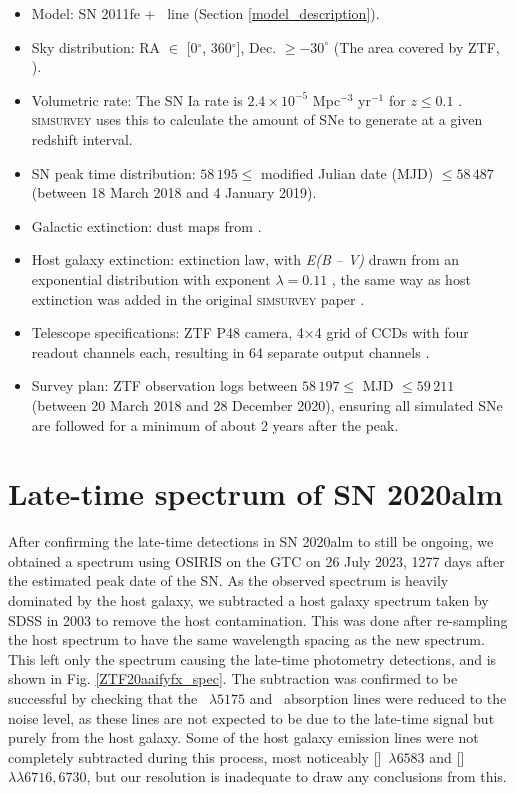 \documentclass[a4paper,oneside,12pt, class=Latex/Classes/PhDthesisPSnPDF, crop=false]{standalone}
\begin{document}
\begin{itemize}
 \item Model: SN 2011fe + \Halpha~line (Section \ref{model_description}).
 \item Sky distribution: RA $\in$ [0$^{\circ}$, 360$^{\circ}$], Dec. $\geq -30^{\circ}$ (The area covered by ZTF, \citealt{ZTF_Surveys_Scheduler}).
 \item Volumetric rate: The SN Ia rate is $2.4\times10^{-5}$ Mpc$^{-3}$ yr$^{-1}$ for $z \leq 0.1$ \citep{SNIa_rate}. \textsc{simsurvey} uses this to calculate the amount of SNe to generate at a given redshift interval.
 \item SN peak time distribution: $58\,195 \leq$ modified Julian date (MJD) $\leq 58\,487$ (between 18 March 2018 and 4 January 2019).
 \item Galactic extinction: dust maps from \citet{SFD98_dust_maps}.
 \item Host galaxy extinction: \citet{ccm89_extinction_law} extinction law, with \textit{E(B -- V)} drawn from an exponential distribution with exponent $\lambda=0.11$ \citep{EBV_simsurvey}, the same way as host extinction was added in the original \textsc{simsurvey} paper \citep{simsurvey_main}.
 \item Telescope specifications: ZTF P48 camera, 4$\times$4 grid of CCDs with four readout channels each, resulting in 64 separate output channels \citep{ZTF_Observing_System}.
 \item Survey plan: ZTF observation logs between $58\,197\leq$ MJD $\leq 59\,211$ (between 20 March 2018 and 28 December 2020), ensuring all simulated SNe are followed for a minimum of about 2 years after the peak.
\end{itemize}


\section{Late-time spectrum of SN 2020alm}
\label{spec_sec}
After confirming the late-time detections in SN 2020alm to still be ongoing, we obtained a spectrum using OSIRIS on the GTC on 26 July 2023, 1277 days after the estimated peak date of the SN. As the observed spectrum is heavily dominated by the host galaxy, we subtracted a host galaxy spectrum taken by SDSS in 2003 to remove the host contamination. This was done after re-sampling the host spectrum to have the same wavelength spacing as the new spectrum. This left only the spectrum causing the late-time photometry detections, and is shown in Fig. \ref{ZTF20aaifyfx_spec}. The subtraction was confirmed to be successful by checking that the \MgI~${\lambda5175}$ and \NaID~absorption lines were reduced to the noise level, as these lines are not expected to be due to the late-time signal but purely from the host galaxy. Some of the host galaxy emission lines were not completely subtracted during this process, most noticeably [\NII]~${\lambda6583}$ and [\SII]~${\lambda\lambda6716,6730}$, but our resolution is inadequate to draw any conclusions from this.
\end{document}
